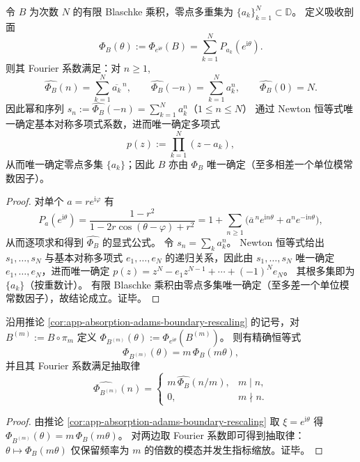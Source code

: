 \begin{proposition}\label{prop:app-absorption-profile-fourier-newton-identifiability}
令 \(B\) 为次数 \(N\) 的有限 Blaschke 乘积，零点多重集为 \(\{a_k\}_{k=1}^{N}\subset\mathbb{D}\)。
定义吸收剖面
\[
\Phi_B(\theta):=\Phi_{e^{\mathrm{i}\theta}}(B)=\sum_{k=1}^{N}P_{a_k}(e^{\mathrm{i}\theta}).
\]
则其 Fourier 系数满足：对 \(n\ge 1\),
\[
\widehat{\Phi_B}(n)=\sum_{k=1}^{N}\overline{a_k}^{\,n},
\qquad
\widehat{\Phi_B}(-n)=\sum_{k=1}^{N}a_k^{n},
\qquad
\widehat{\Phi_B}(0)=N.
\]
因此幂和序列 \(s_n:=\widehat{\Phi_B}(-n)=\sum_{k=1}^{N}a_k^{n}\)（\(1\le n\le N\)）
通过 Newton 恒等式唯一确定基本对称多项式系数，进而唯一确定多项式
\[
p(z):=\prod_{k=1}^{N}(z-a_k),
\]
从而唯一确定零点多集 \(\{a_k\}\)；因此 \(B\) 亦由 \(\Phi_B\) 唯一确定（至多相差一个单位模常数因子）。
\end{proposition}

\begin{proof}
对单个 \(a=re^{\mathrm{i}\varphi}\) 有
\[
P_{a}(e^{\mathrm{i}\theta})
=\frac{1-r^2}{1-2r\cos(\theta-\varphi)+r^2}
=1+\sum_{n\ge 1}\bigl(\overline{a}^{\,n}e^{\mathrm{i}n\theta}+a^n e^{-\mathrm{i}n\theta}\bigr),
\]
从而逐项求和得到 \(\widehat{\Phi_B}\) 的显式公式。
令 \(s_n=\sum_k a_k^n\)。
Newton 恒等式给出 \(s_1,\dots,s_N\) 与基本对称多项式 \(e_1,\dots,e_N\) 的递归关系，因此由 \(s_1,\dots,s_N\) 唯一确定 \(e_1,\dots,e_N\)，进而唯一确定 \(p(z)=z^N-e_1z^{N-1}+\cdots+(-1)^N e_N\)。
其根多集即为 \(\{a_k\}\)（按重数计）。
有限 Blaschke 乘积由零点多集唯一确定（至多差一个单位模常数因子），故结论成立。证毕。
\end{proof}

\begin{corollary}\label{cor:app-absorption-profile-adams-alias-extraction}
沿用推论 \ref{cor:app-absorption-adams-boundary-rescaling} 的记号，对 \(B^{(m)}:=B\circ\pi_m\) 定义
\(\Phi_{B^{(m)}}(\theta):=\Phi_{e^{\mathrm{i}\theta}}(B^{(m)})\)。
则有精确恒等式
\[
\Phi_{B^{(m)}}(\theta)=m\,\Phi_B(m\theta),
\]
并且其 Fourier 系数满足抽取律
\[
\widehat{\Phi_{B^{(m)}}}(n)=
\begin{cases}
m\,\widehat{\Phi_B}(n/m),& m\mid n,\\
0,& m\nmid n.
\end{cases}
\]
\end{corollary}

\begin{proof}
由推论 \ref{cor:app-absorption-adams-boundary-rescaling} 取 \(\xi=e^{\mathrm{i}\theta}\) 得 \(\Phi_{B^{(m)}}(\theta)=m\,\Phi_B(m\theta)\)。
对两边取 Fourier 系数即可得到抽取律：\(\theta\mapsto \Phi_B(m\theta)\) 仅保留频率为 \(m\) 的倍数的模态并发生指标缩放。证毕。
\end{proof}
